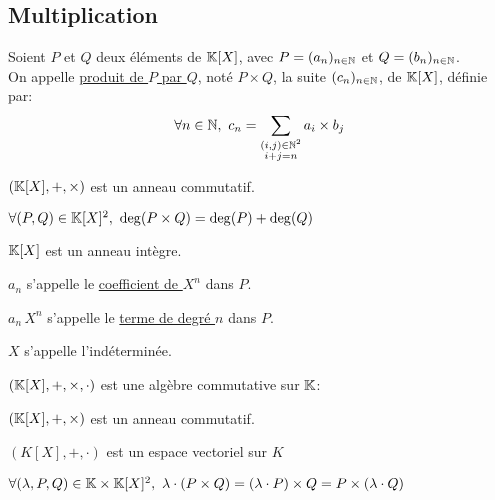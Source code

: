 \documentclass[12pt,twoside,a4paper]{article}
\begin{document}
		\subsection{Multiplication}
			\begin{defi}
				Soient $P$ et $Q$ deux éléments de $\mathbb{K}[X]$, avec $P=(a_n)_{n\in\mathbb{N}}$ et $Q=(b_n)_{n\in\mathbb{N}}$.\\
				On appelle \underline{produit de $P$ par $Q$}, noté $P\times Q$, la suite $(c_n)_{n\in\mathbb{N}}$, de $\mathbb{K}[X]$, définie par:
				$$\forall n\in\N,\ c_n=\sum\limits_{\substack{(i,j)\in\N^{2}\\i+j=n}}a_i\times b_j$$
			\end{defi}
			\begin{prop}
				$(\mathbb{K}[X],+,\times)$ est un anneau commutatif.
			\end{prop}
			\begin{prop}
				$\forall (P,Q)\in\mathbb{K}[X]^{2},\ \deg(P\times Q)=\deg(P)+\deg(Q)$
			\end{prop}
			\begin{coro}
				$\mathbb{K}[X]$ est un anneau intègre.
			\end{coro}
			\begin{defi}
				\begin{liste}
					\item $a_n$ s'appelle le \underline{coefficient de $X^{n}$} dans $P$.
					\item $a_n\,X^{n}$ s'appelle le \underline{terme de degré $n$} dans $P$.
					\item $X$ s'appelle l'indéterminée.
				\end{liste}
			\end{defi}
			\begin{prop}
				$(\mathbb{K}[X],+,\times,\cdot)$ est une algèbre commutative sur $\mathbb{K}$:
				\begin{liste}
					\item $(\mathbb{K}[X],+,\times)$ est un anneau commutatif.
					\item $(K[X],+,\cdot)$ est un espace vectoriel sur $K$
					\item $\forall(\lambda,P,Q)\in\mathbb{K}\times \mathbb{K}[X]^{2},\ \lambda\cdot(P\times Q)=(\lambda\cdot P)\times Q=P\times(\lambda\cdot Q)$
				\end{liste}
			\end{prop}
\end{document}
